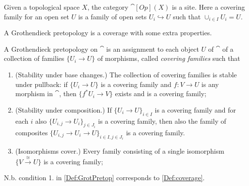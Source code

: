\documentclass[a4paper,11pt]{article}  %
\begin{document}
\begin{example}\label{Ex:CatOpX}
	Given a topological space $X$, the category $\cat[Op](X)$ is a site.
	Here a covering family for an open set $U$ is a family of open sets $U_i \hookrightarrow U$ such that $\cup_{i\in I}U_i = U$. 
\end{example}
%
A Grothendieck pretopology is a coverage with some extra properties.
%
\begin{definition}\label{Def:GrotPretop}
A Grothendieck pretopology on $\cat$ is an assignment to each object  $U$ of $\cat$ of a collection of families $\{U_i \to U\}$ of morphisms, called \emph{covering families} such that
\begin{enumerate}
	\item (Stability under base changes.)
The collection of covering families is stable under pullback: if $\{U_i \to U\}$ is a covering family and $f : V \to U$ is any morphism in $\cat$, then $\{f^* U_i \to V\}$ exists and is a covering family;
	\item (Stability under composition.)
If $\{U_i \to U\}_{i \in I}$ is a covering family and for each $i$ also $\{U_{i,j} \to U_i\}_{j \in J_i}$ is a covering family, then also the family of composites $\{U_{i,j} \to U_i \to U\}_{i\in I, j \in J_i}$ is a covering family.
	\item (Isomorphisms cover.)
Every family consisting of a single isomorphism $\{V \stackrel{\cong}{\to}U\}$ is a covering family;
\end{enumerate}
\end{definition}

N.b. condition 1. in \cref{Def:GrotPretop} corresponds to \cref{Def:coverage}.






\end{document}
